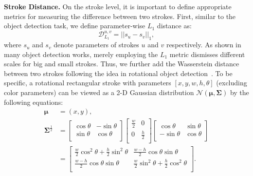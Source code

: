 \documentclass[10pt,twocolumn,letterpaper]{article}
\begin{document}
\noindent
\textbf{Stroke Distance.}
On the stroke level, it is important to define appropriate metrics for measuring the difference between two strokes.
First, similar to the object detection task, we define parameter-wise $L_1$ distance as:
\begin{equation}
    \mathcal{D}^{u,v}_{L_1}=\left|\left|s_u-s_v\right|\right|_1,\label{l_gt}
\end{equation}
where $s_u$ and $s_v$ denote parameters of strokes $u$ and $v$ respectively.
As shown in many object detection works, merely employing the $L_1$ metric dismisses different scales for big and small strokes.
Thus, we further add the Wasserstein distance between two strokes following the idea in rotational object detection~\cite{yang2021rethinking}.
To be specific, a rotational rectangular stroke with parameters $[x,y,w,h,\theta]$ (excluding color parameters) can be viewed as a 2-D Gaussian distribution $\mathcal{N}(\mathbf{\mu},\mathbf{\Sigma})$ by the following equations:
\begin{equation}
\begin{aligned}
    \mathbf{\mu}&=(x,y),\\
    \mathbf{\Sigma}^{\frac{1}{2}}
    &=\begin{bmatrix}
        \cos\theta & -\sin\theta \\
        \sin\theta & \cos\theta \\
    \end{bmatrix}
    \begin{bmatrix}
        \frac{w}{2} & 0 \\
        0 & \frac{h}{2} \\
    \end{bmatrix}
    \begin{bmatrix}
        \cos\theta & \sin\theta \\
        -\sin\theta & \cos\theta \\
    \end{bmatrix}\\
    &=\begin{bmatrix}
        \frac{w}{2}\cos^2\theta+\frac{h}{2}\sin^2\theta & \frac{w-h}{2}\cos\theta\sin\theta \\
        \frac{w-h}{2}\cos\theta\sin\theta & \frac{w}{2}\sin^2\theta+\frac{h}{2}\cos^2\theta \\
    \end{bmatrix}.
\end{aligned}
\end{equation}
\end{document}
